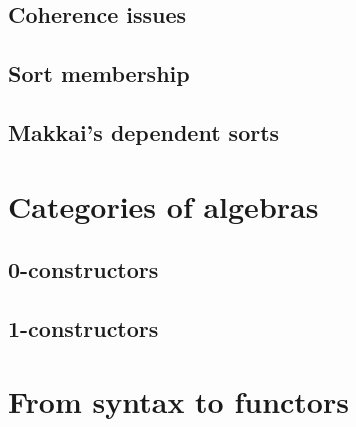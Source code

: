 

\subsection{Coherence issues}

\subsection{Sort membership}


\subsection{Makkai's dependent sorts}

\section{Categories of algebras}

\subsection{0-constructors}

\subsection{1-constructors}


\section{From syntax to functors}

